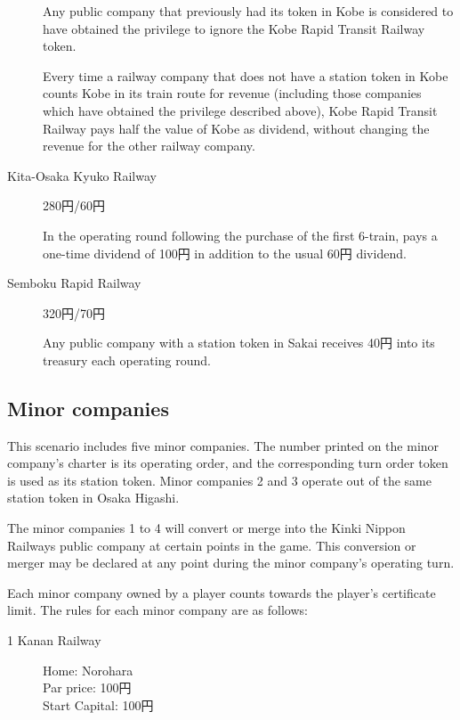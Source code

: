 \documentclass{article}
\begin{document}
\begin{CJK}{UTF8}{min}
\begin{multicols}{2}
\begin{description}
  Any public company that previously had its token in Kobe is
  considered to have obtained the privilege to ignore the Kobe Rapid
  Transit Railway token.

  Every time a railway company that does not have a station token in
  Kobe counts Kobe in its train route for revenue (including those
  companies which have obtained the privilege described above), Kobe
  Rapid Transit Railway pays half the value of Kobe as dividend,
  without changing the revenue for the other railway company.

\item[Kita-Osaka Kyuko Railway] \hfill 280円/60円

  In the operating round following the purchase of the first 6-train,
  pays a one-time dividend of 100円 in addition to the usual 60円 dividend.

\item[Semboku Rapid Railway] \hfill 320円/70円

  Any public company with a station token in Sakai receives 40円
  into its treasury each operating round.
\end{description}

\subsection{Minor companies}
\label{sec:minor-companies}

This scenario includes five minor companies. The number printed on the
minor company's charter is its operating order, and the corresponding
turn order token is used as its station token. Minor companies 2 and 3
operate out of the same station token in Osaka Higashi.

The minor companies 1 to 4 will convert or merge into the Kinki Nippon
Railways public company at certain points in the game. This conversion
or merger may be declared at any point during the minor company's
operating turn.

Each minor company owned by a player counts towards the player's
certificate limit. The rules for each minor company are as follows:

\begin{description}

\item[1 Kanan Railway] \hfill

Home: Norohara \\
Par price: 100円 \\
Start Capital: 100円


\end{description}
\end{multicols}
\end{CJK}
\end{document}
